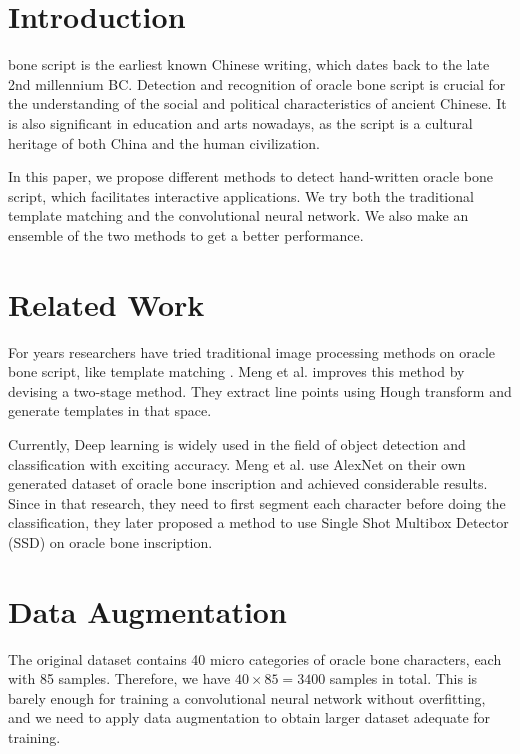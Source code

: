 \documentclass[journal]{IEEEtran}
\begin{document}
\IEEEpeerreviewmaketitle



\section{Introduction}
 bone script is the earliest known Chinese writing, which dates back to the late 2nd millennium BC. Detection and recognition of oracle bone script is crucial for the understanding of the social and political characteristics of ancient Chinese. It is also significant in education and arts nowadays, as the script is a cultural heritage of both China and the human civilization.

In this paper, we propose different methods to detect hand-written oracle bone script, which facilitates interactive applications. We try both the traditional template matching and the convolutional neural network. We also make an ensemble of the two methods to get a better performance.

\section{Related Work}
For years researchers have tried traditional image processing methods on oracle bone script, like template matching \cite{tm}. Meng et al. \cite{tm1} improves this method by devising a two-stage method. They extract line points using Hough transform and generate templates in that space. 

Currently, Deep learning is widely used in the field of object detection and classification with exciting accuracy. Meng et al. \cite{conv} use AlexNet on their own generated dataset of oracle bone inscription and achieved considerable results. Since in that research, they need to first segment each character before doing the classification, they later proposed a method \cite{ssd} to use Single Shot Multibox Detector (SSD) on oracle bone inscription.


\section{Data Augmentation}
The original dataset contains 40 micro categories of oracle bone characters, each with 85 samples.
Therefore, we have $40 \times 85 = 3400$ samples in total.
This is barely enough for training a convolutional neural network without overfitting, and we need to apply data augmentation to obtain larger dataset adequate for training.
\end{document}
